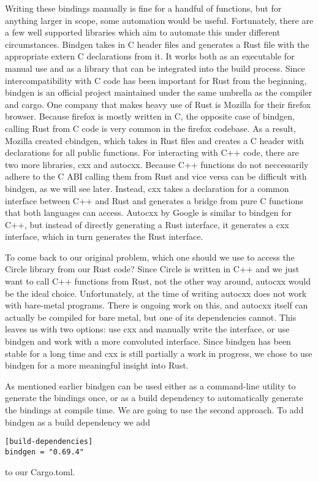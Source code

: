 Writing these bindings manually is fine for a handful of functions, but for anything larger in scope, some automation would be useful.
Fortunately, there are a few well supported libraries which aim to automate this under different circumstances.
Bindgen takes in C header files and generates a Rust file with the appropriate extern C declarations from it.
It works both as an executable for manual use and as a library that can be integrated into the build process.
Since intercompatibility with C code has been important for Rust from the beginning,
bindgen is an official project maintained under the same umbrella as the compiler and cargo.
One company that makes heavy use of Rust is Mozilla for their firefox browser.
Because firefox is mostly written in C, the opposite case of bindgen, calling Rust from C code is very common in the firefox codebase.
As a result, Mozilla created cbindgen, which takes in Rust files and creates a C header with declarations for all public functions.
For interacting with C++ code, there are two more libraries, cxx and autocxx.
Because C++ functions do not neccessarily adhere to the C ABI calling them from Rust and vice versa can be difficult with bindgen, as we will see later.
Instead, cxx takes a declaration for a common interface between C++ and Rust and generates a bridge from pure C functions that both languages can access.
Autocxx by Google is similar to bindgen for C++, but instead of directly generating a Rust interface, it generates a cxx interface, which in turn generates the Rust interface.

To come back to our original problem, which one should we use to access the Circle library from our Rust code?
Since Circle is written in C++ and we just want to call C++ functions from Rust, not the other way around, autocxx would be the ideal choice.
Unfortunately, at the time of writing autocxx does not work with bare-metal programs.
There is ongoing work on this, and autocxx itself can actually be compiled for bare metal, but one of its dependencies cannot.
This leaves us with two options: use cxx and manually write the interface, or use bindgen and work with a more convoluted interface.
Since bindgen has been stable for a long time and cxx is still partially a work in progress, we chose to use bindgen for a more meaningful insight into Rust.

As mentioned earlier bindgen can be used either as a command-line utility to generate the bindings once,
or as a build dependency to automatically generate the bindings at compile time.
We are going to use the second approach.
To add bindgen as a build dependency we add
\begin{verbatim}
[build-dependencies]
bindgen = "0.69.4"
\end{verbatim}
to our Cargo.toml.

